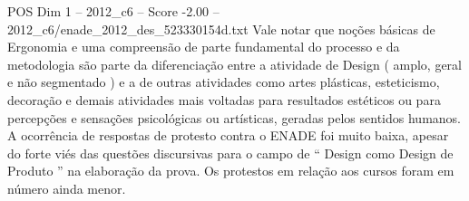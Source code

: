\begin{textsample}{POS Dim 1 – 2012\_c6 – Score -2.00 – 2012\_c6/enade\_2012\_des\_523330154d.txt}
Vale notar que noções básicas de Ergonomia e uma compreensão de parte fundamental do processo e da metodologia são parte da diferenciação entre a atividade de Design ( amplo, geral e não segmentado ) e a de outras atividades como artes plásticas, esteticismo, decoração e demais atividades mais voltadas para resultados estéticos ou para percepções e sensações psicológicas ou artísticas, geradas pelos sentidos humanos.
A ocorrência de respostas de protesto contra o ENADE foi muito baixa, apesar do forte viés das questões discursivas para o campo de “ Design como Design de Produto ” na elaboração da prova.
Os protestos em relação aos cursos foram em número ainda menor.

\end{textsample}
